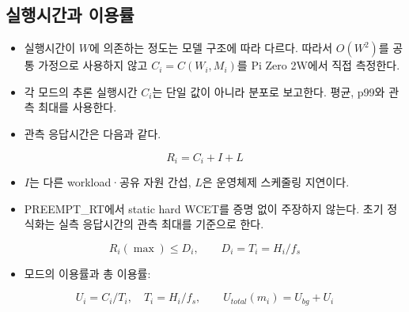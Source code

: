 \documentclass[10pt]{article}
\begin{document}
\subsection{실행시간과 이용률}
\begin{itemize}
\item 실행시간이 $W$에 의존하는 정도는 모델 구조에 따라 다르다. 따라서 $O(W^2)$를 공통 가정으로 사용하지 않고 $C_i=C(W_i,M_i)$를 Pi Zero 2W에서 직접 측정한다.
\item 각 모드의 추론 실행시간 $C_i$는 단일 값이 아니라 분포로 보고한다. 평균, p99와 관측 최대를 사용한다.
\item 관측 응답시간은 다음과 같다.
\end{itemize}
\[ R_i = C_i + I + L \]
\begin{itemize}
\item $I$는 다른 workload·공유 자원 간섭, $L$은 운영체제 스케줄링 지연이다.
\item PREEMPT\_RT에서 static hard WCET를 증명 없이 주장하지 않는다. 초기 정식화는 실측 응답시간의 관측 최대를 기준으로 한다.
\end{itemize}
\[ R_i(\max) \le D_i,\qquad D_i=T_i=H_i/f_s \]
\begin{itemize}
\item 모드의 이용률과 총 이용률:
\end{itemize}
\[ U_i = C_i / T_i,\quad T_i = H_i / f_s,\qquad U_{total}(m_i) = U_{bg} + U_i \]
\end{document}
